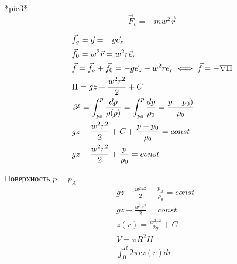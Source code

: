 *pic3*
\[
  \vec{F}_c = -mw^2 \vec{r}
\]


\begin{align*}
  &\vec{f}_g = \vec{g} = -g \vec{e}_z \\
  &\vec{f}_0 = w^2 \vec{r} = w^2 r \vec{e}_r \\
  &\vec{f} = \vec{f}_g + \vec{f}_0 = -g\vec{e}_z + w^2 r \vec{e}_r \iff \vec{f} = -\nabla \Pi \\
  &\Pi = gz - \frac{w^2r^2}{2} + C\\
  &\P = \int_{p_0}^p \frac{dp}{\rho(p)} = \int_{p_0}^p  \frac{dp}{\rho_0} = \frac{p - p_0)}{\rho_0}\\
  &gz - \frac{w^2r^2}{2} + C + \frac{p - p_0}{\rho_0} = const \\
  &gz - \frac{w^2r^2}{2} + \frac{p}{\rho_0} = const
\end{align*}

Поверхность $p = p_A$
\begin{align*}
  &gz - \frac{w^2r^2}{2} + \frac{p_A}{\rho_0} = const \\
  &gz - \frac{w^2r^2}{2} = const \\
  &z(r) = \frac{w^2r^2}{2g} + C\\
  &V = \pi R^2 H \\
  &\int_0^R 2 \pi r z(r) dr
\end{align*}